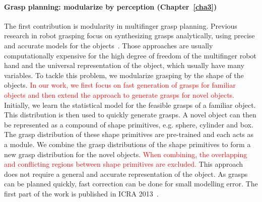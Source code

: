 \paragraph{Grasp planning: modularize by perception (Chapter~\ref{cha3})}
The first contribution is modularity in multifinger grasp planning. Previous research in robot grasping focus on synthesizing grasps analytically, using precise and accurate models for the objects~\citep{sahbani2011overview}. Those approaches are usually computationally expensive for the high degree of freedom of the multifinger robot hand and the universal representation of the object, which usually have many variables. To tackle this problem, we modularize grasping by the shape of the objects. \textcolor{red}{In our work, we first focus on fast generation of grasps for familiar objects and then extend the approach to generate grasps for novel objects.}
Initially, we learn the statistical model for the feasible grasps of a familiar object. This distribution is then used to quickly generate grasps. A novel object can then be represented as a compound of shape primitives, e.g. sphere, cylinder and box. The grasp distribution of these shape primitives are pre-trained and each acts as a module. We combine the grasp distributions of the shape primitives to form a new grasp distribution for the novel objects. \textcolor{red}{When combining, the overlapping and conflicting regions between shape primitives are excluded.}
This approach does not require a general and accurate representation of the object. As grasps can be planned quickly, fast correction can be done for small modelling error. The first part of the work is published in ICRA 2013~\citep{bidan2013grasp}.



